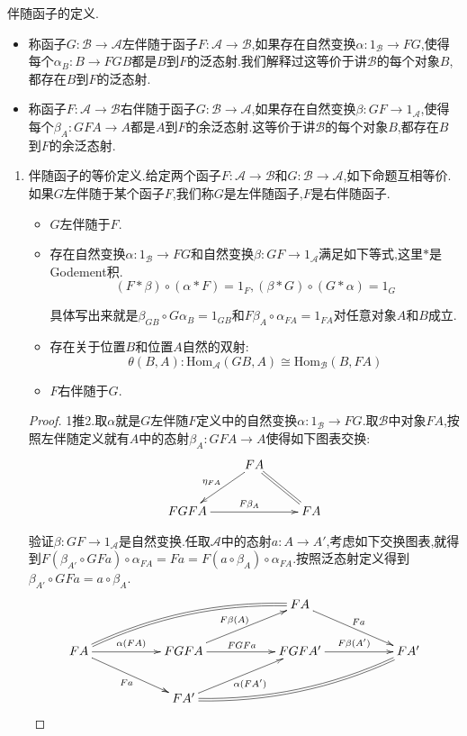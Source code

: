 伴随函子的定义.
\begin{itemize}
	\item 称函子$G:\mathscr{B}\to\mathscr{A}$左伴随于函子$F:\mathscr{A}\to\mathscr{B}$,如果存在自然变换$\alpha:1_{\mathscr{B}}\to FG$,使得每个$\alpha_B:B\to FGB$都是$B$到$F$的泛态射.我们解释过这等价于讲$\mathscr{B}$的每个对象$B$,都存在$B$到$F$的泛态射.
	\item 称函子$F:\mathscr{A}\to\mathscr{B}$右伴随于函子$G:\mathscr{B}\to\mathscr{A}$,如果存在自然变换$\beta:GF\to 1_{\mathscr{A}}$,使得每个$\beta_A:GFA\to A$都是$A$到$F$的余泛态射.这等价于讲$\mathscr{B}$的每个对象$B$,都存在$B$到$F$的余泛态射.
\end{itemize}
\begin{enumerate}
	\item 伴随函子的等价定义.给定两个函子$F:\mathscr{A}\to\mathscr{B}$和$G:\mathscr{B}\to\mathscr{A}$,如下命题互相等价.如果$G$左伴随于某个函子$F$,我们称$G$是左伴随函子,$F$是右伴随函子.
	\begin{itemize}
		\item $G$左伴随于$F$.
		\item 存在自然变换$\alpha:1_{\mathscr{B}}\to FG$和自然变换$\beta:GF\to 1_{\mathscr{A}}$满足如下等式,这里$\ast$是Godement积.
		$$\left(F\ast\beta\right)\circ\left(\alpha\ast F\right)=1_F,\left(\beta\ast G\right)\circ\left(G\ast\alpha\right)=1_G$$
		
		具体写出来就是$\beta_{GB}\circ G\alpha_B=1_{GB}$和$F\beta_A\circ\alpha_{FA}=1_{FA}$对任意对象$A$和$B$成立.
		\item 存在关于位置$B$和位置$A$自然的双射:
		$$\theta(B,A):\mathrm{Hom}_{\mathscr{A}}(GB,A)\cong\mathrm{Hom}_{\mathscr{B}}(B,FA)$$
		\item $F$右伴随于$G$.
	\end{itemize}
    \begin{proof}
    	
    	1推2.取$\alpha$就是$G$左伴随$F$定义中的自然变换$\alpha:1_{\mathscr{B}}\to FG$.取$\mathscr{B}$中对象$FA$,按照左伴随定义就有$A$中的态射$\beta_A:GFA\to A$使得如下图表交换:
    	$$\xymatrix{&FA\ar@{=}[dr]\ar[dl]_{\eta_{FA}}&\\FGFA\ar[rr]^{F\beta_A}&&FA}$$
    	
    	验证$\beta:GF\to 1_{\mathscr{A}}$是自然变换.任取$\mathscr{A}$中的态射$a:A\to A'$,考虑如下交换图表,就得到$F(\beta_{A'}\circ GFa)\circ\alpha_{FA}=Fa=F(a\circ\beta_A)\circ\alpha_{FA}$.按照泛态射定义得到$\beta_{A'}\circ GFa=a\circ\beta_A$.
    	$$\xymatrix{&&&&FA\ar[drr]^{Fa}&&\\FA\ar@{=}@/^1pc/[urrrr]\ar[rr]^{\alpha(FA)}\ar[drr]_{Fa}&&FGFA\ar[rr]^{FGFa}\ar[urr]^{F\beta(A)}&&FGFA'\ar[rr]^{F\beta(A')}&&FA'\\&&FA'\ar[urr]_{\alpha(FA')}\ar@{=}@/_1pc/[urrrr]&&&&}$$
    	

\end{proof}
\end{enumerate}
